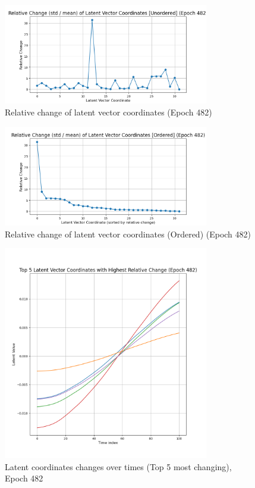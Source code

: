 \documentclass[a4paper,12pt]{article}
\begin{document}
\begin{figure}[h!]
	\centering
	\includegraphics[width=0.8\textwidth]{./Latent Plots/Figure_1.png}
	\caption{Relative change of latent vector coordinates (Epoch 482)}
	\label{fig:relative-change-unordered}
\end{figure}

\begin{figure}[h!]
	\centering
	\includegraphics[width=0.8\textwidth]{./Latent Plots/Figure_2.png}
	\caption{Relative change of latent vector coordinates (Ordered) (Epoch 482)}
	\label{fig:relative-change-ordered}
\end{figure}

\begin{figure}[h!]
	\centering
	\includegraphics[width=0.8\textwidth]{./Latent Plots/Figure_3.png}
	\caption{Latent coordinates changes over times (Top 5 most changing), Epoch 482}
	\label{fig:latent-vector-top-5}
\end{figure}
\end{document}
